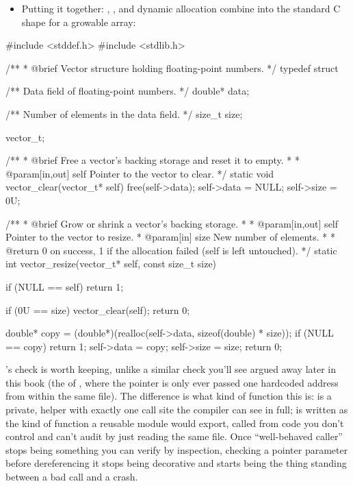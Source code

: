 \begin{itemize}
  \item Putting it together: , , and dynamic allocation combine into the
    standard C shape for a growable array:
\end{itemize}

\begin{ccode}
#include <stddef.h>
#include <stdlib.h>

/**
 * @brief Vector structure holding floating-point numbers.
 */
typedef struct
{
    /** Data field of floating-point numbers. */
    double* data;

    /** Number of elements in the data field. */
    size_t size;
} vector_t;

/**
 * @brief Free a vector's backing storage and reset it to empty.
 *
 * @param[in,out] self Pointer to the vector to clear.
 */
static void vector_clear(vector_t* self)
{
    free(self->data);
    self->data = NULL;
    self->size = 0U;
}

/**
 * @brief Grow or shrink a vector's backing storage.
 *
 * @param[in,out] self Pointer to the vector to resize.
 * @param[in] size New number of elements.
 *
 * @return 0 on success, 1 if the allocation failed (self is left untouched).
 */
static int vector_resize(vector_t* self, const size_t size)
{
    if (NULL == self) { return 1; }

    if (0U == size)
    {
        vector_clear(self);
        return 0;
    }

    double* copy = (double*)(realloc(self->data, sizeof(double) * size));
    if (NULL == copy) { return 1; }
    self->data = copy;
    self->size = size;
    return 0;
}
\end{ccode}

\noindent{}'s  check is worth keeping, unlike a similar check
you'll see argued away later in this book (the  of , where the
pointer is only ever passed one hardcoded address from within the same file). The difference is
what kind of function this is:  is a private,  helper with exactly
one call site the compiler can see in full;  is written as the kind of
function a reusable module would export, called from code you don't control and can't audit by
just reading the same file. Once ``well-behaved caller'' stops being something you can verify by
inspection, checking a pointer parameter before dereferencing it stops being decorative and starts
being the thing standing between a bad call and a crash.

